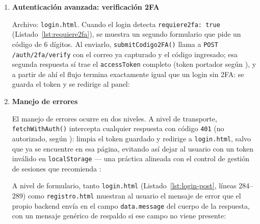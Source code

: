 \documentclass[12pt,a4paper]{article}
\begin{document}
\begin{enumerate}
    \item \textbf{Autenticación avanzada: verificación 2FA}\label{step:2fa}

    \begin{sloppypar}
    Archivo: \texttt{login.html}. Cuando el login detecta \texttt{requiere2fa: true} (Listado~\ref{lst:requiere2fa}), se muestra un segundo formulario que pide un código de 6 dígitos. Al enviarlo, \texttt{submitCodigo2FA()} llama a \texttt{POST /auth/2fa/verify} con el correo ya capturado y el código ingresado; esa segunda respuesta sí trae el \texttt{accessToken} completo (token portador según \cite{rfc7519}), y a partir de ahí el flujo termina exactamente igual que un login sin 2FA: se guarda el token y se redirige al panel:
    \end{sloppypar}

    

    \item \textbf{Manejo de errores}\label{step:errores}

    \begin{sloppypar}
    El manejo de errores ocurre en dos niveles. A nivel de transporte, \texttt{fetchWithAuth()} intercepta cualquier respuesta con código \texttt{401} (no autorizado, según \cite{rfc9110}): limpia el token guardado y redirige a \texttt{login.html}, salvo que ya se encuentre en esa página, evitando así dejar al usuario con un token inválido en \texttt{localStorage} --- una práctica alineada con el control de gestión de sesiones que recomienda \cite{owasp2021}:
    \end{sloppypar}

    

    A nivel de formulario, tanto \texttt{login.html} (Listado~\ref{lst:login-post}, líneas 284--289) como \texttt{registro.html} muestran al usuario el mensaje de error que el propio backend envía en el campo \texttt{data.message} del cuerpo de la respuesta, con un mensaje genérico de respaldo si ese campo no viene presente:

    

\end{enumerate}
\end{document}
